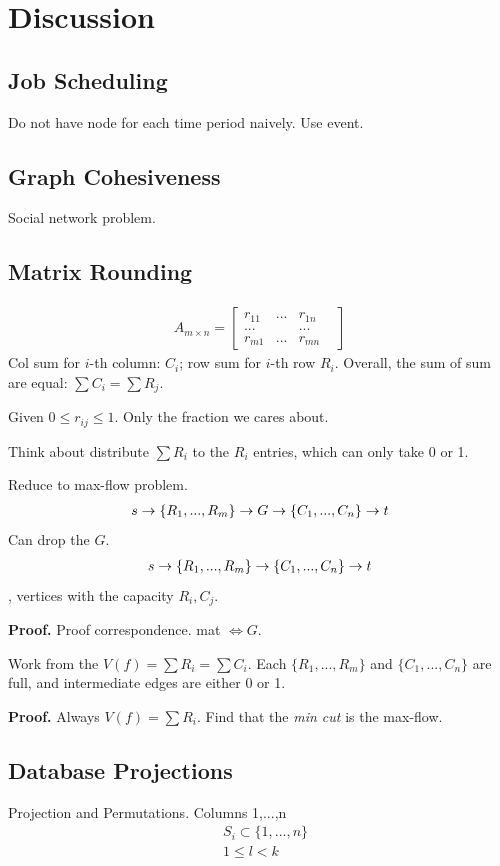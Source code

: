 \documentclass[a4paper]{report}
\theoremstyle{definition}
\begin{document}
\section{Discussion}
\subsection{Job Scheduling}
Do not have node for each time period naively. Use event. 
\subsection{Graph Cohesiveness}
Social network problem. 

\subsection{Matrix Rounding}
\begin{align*}
A_{m\times n} = \begin{bmatrix}
r_{11} & ... & r_{1n} \\
... & &...&\\
r_{m1} & ... & r_{mn}
\end{bmatrix}
\end{align*}
Col sum for $i$-th column: $C_i$; row sum for $i$-th row $R_i$. Overall, the sum of sum are equal: $\sum C_i = \sum R_j$. 

Given $0 \leq r_{ij}\leq 1$. Only the fraction we cares about. 

Think about distribute $\sum R_i$ to the $R_i$ entries, which can only take 0 or 1.

Reduce to max-flow problem. 
\begin{align*}
s \rightarrow \{R_1, ..., R_m\} \rightarrow G \rightarrow \{C_1, ..., C_n\} \rightarrow t
\end{align*}
Can drop the $G$. 
\begin{align*}
s \rightarrow \{R_1, ..., R_m\} \rightarrow \{C_1, ..., C_n\} \rightarrow t
\end{align*}
, vertices with the capacity $R_i, C_j$. 


\textbf{Proof.} Proof correspondence. mat $\Leftrightarrow G$. 

Work from the $V(f)=\sum R_i =\sum C_i$. Each $\{R_1, ..., R_m\}$ and $\{C_1, ..., C_n\}$ are full, and intermediate edges are either 0 or 1. 

\textbf{Proof.} Always $V(f)=\sum R_i$. Find that the \textit{min cut} is the max-flow.
\subsection{Database Projections}
Projection and Permutations.
Columns 1,...,n
\begin{align*}
& S_i \subset \{1,..., n\}\\
& 1 \leq l < k
\end{align*}
\end{document}
